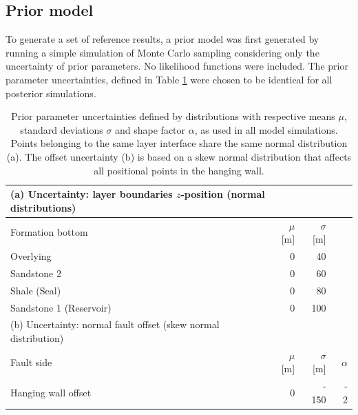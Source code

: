 		\subsection{Prior model}
		To generate a set of reference results, a prior model was first generated by running a simple simulation of Monte Carlo sampling considering only the uncertainty of prior parameters. No likelihood functions were included. The prior parameter uncertainties, defined in Table \ref{tab:3D_prior_parameters} were chosen to be identical for all posterior simulations.
		\begin{table}[h]
		\centering
		\begin{tabular}{lrrr} 
			\toprule
			(a) Uncertainty: layer boundaries $z$-position (normal distributions)\\  
			\midrule 
			Formation bottom & $\mu$ [m] & $\sigma$ [m]\\ 
			\midrule 
			Overlying & 0 & 40 \\
			Sandstone 2 & 0 & 60 \\
			Shale (Seal) & 0 & 80\\ 
			Sandstone 1 (Reservoir) & 0 & 100 \\
			\bottomrule
			\toprule
			(b) Uncertainty: normal fault offset (skew normal distribution)\\
			\midrule
			Fault side & $\mu$ [m] & $\sigma$ [m] & $\alpha$\\
			\midrule
			Hanging wall offset & 0 & -~150 & -~2\\
			\bottomrule 
		\end{tabular}
		\caption{Prior parameter uncertainties defined by distributions with respective means $\mu$, standard deviations $\sigma$ and shape factor $\alpha$, as used in all model simulations. Points belonging to the same layer interface share the same normal distribution (a). The offset uncertainty (b) is based on a skew normal distribution that affects all positional points in the hanging wall.}
		\label{tab:3D_prior_parameters}
		\end{table}
